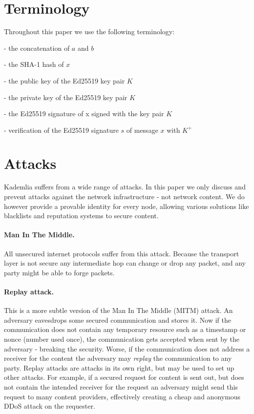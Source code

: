 \documentclass[12pt]{article}
\begin{document}
\section{Terminology}

Throughout this paper we use the following terminology:

\begin{description}[noitemsep]
    \item[$a || b$] - the concatenation of $a$ and $b$
    \item[$H(x)$] - the SHA-1 hash of $x$
    \item[$K^+$] - the public key of the Ed25519 key pair $K$
    \item[$K^-$] - the private key of the Ed25519 key pair $K$
    \item[$Sign(x, K)$] - the Ed25519 signature of x signed with the key pair $K$
    \item[$Verify(s, x, K^+)$] - verification of the Ed25519 signature $s$ of message $x$ with $K^+$
\end{description}




\section{Attacks}

Kademlia suffers from a wide range of attacks. In this paper
we only discuss and prevent attacks against the network infrastructure - not
network content. We do however provide a provable identity for every node,
allowing various solutions like blacklists and reputation systems to secure
content.

\paragraph{Man In The Middle.} All unsecured internet protocols suffer from
this attack. Because the transport layer is not secure any intermediate hop can
change or drop any packet, and any party might be able to forge packets.

\paragraph{Replay attack.} This is a more subtle version of the Man In The
Middle (MITM) attack. An adversary eavesdrops some secured communication and
stores it. Now if the communication does not contain any temporary resource
such as a timestamp or nonce (number used once), the communication gets
accepted when sent by the adversary - breaking the security. Worse, if the
communication does not address a receiver for the content the adversary may
\emph{replay} the communication to any party. Replay attacks are attacks in
its own right, but may be used to set up other attacks. For example, if a
secured request for content is sent out, but does not contain the intended
receiver for the request an adversary might send this request to many content
providers, effectively creating a cheap and anonymous DDoS attack on the
requester.
\end{document}
